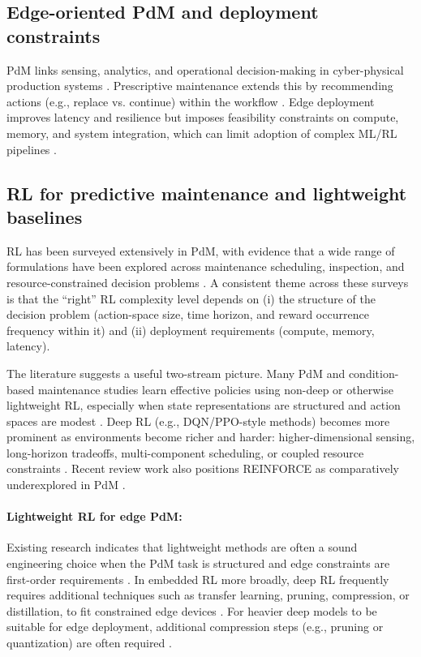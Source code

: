 \documentclass[sn-basic]{sn-jnl}%
\begin{document}
\subsection{Edge-oriented PdM and deployment constraints}
PdM links sensing, analytics, and operational decision-making in cyber-physical production systems \cite{Compare2020, Zonta2020}. Prescriptive maintenance extends this by recommending actions (e.g., replace vs. continue) within the workflow \cite{Ansari2019}. Edge deployment improves latency and resilience but imposes feasibility constraints on compute, memory, and system integration, which can limit adoption of complex ML/RL pipelines \cite{Njor2024, Pandey2023}.

\subsection{RL for predictive maintenance and lightweight baselines}
RL has been surveyed extensively in PdM, with evidence that a wide range of formulations have been explored across maintenance scheduling, inspection, and resource-constrained decision problems \cite{Siraskar2023, Ogunfowora2023, Zhang2024}. A consistent theme across these surveys is that the ``right'' RL complexity level depends on (i) the structure of the decision problem (action-space size, time horizon, and reward occurrence frequency within it) and (ii) deployment requirements (compute, memory, latency).

The literature suggests a useful two-stream picture. Many PdM and condition-based maintenance studies learn effective policies using non-deep or otherwise lightweight RL, especially when state representations are structured and action spaces are modest \cite{Adsule2020, Yousefi2020, Rasay2024, Dadash2024}. Deep RL (e.g., DQN/PPO-style methods) becomes more prominent as environments become richer and harder: higher-dimensional sensing, long-horizon tradeoffs, multi-component scheduling, or coupled resource constraints \cite{Liu2020, Chen2023, Lee2022, Ong2022-02}. Recent review work also positions \textsc{REINFORCE} as comparatively underexplored in PdM \cite{Siraskar2025}.

\paragraph{Lightweight RL for edge PdM:}
Existing research indicates that lightweight methods are often a sound engineering choice when the PdM task is structured and edge constraints are first-order requirements \cite{Compare2020, Njor2024, Pandey2023}. In embedded RL more broadly, deep RL frequently requires additional techniques such as transfer learning, pruning, compression, or distillation, to fit constrained edge devices \cite{Jang2020, Szydlo2022, Xu2022}. For heavier deep models to be suitable for edge deployment, additional compression steps (e.g., pruning or quantization) are often required \cite{Pandey2023, Jang2020, Xu2022}.
\end{document}
